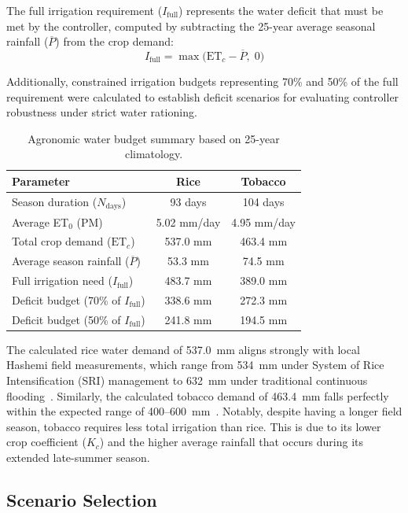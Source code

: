 The full irrigation requirement ($I_{\text{full}}$) represents the water deficit that must be met by the controller, computed by subtracting the 25-year average seasonal rainfall ($\overline{P}$) from the crop demand:
\begin{equation}
    I_{\text{full}} = \max\!\big(\text{ET}_c - \overline{P},\; 0\big)
\end{equation}

Additionally, constrained irrigation budgets representing 70\% and 50\% of the full requirement were calculated to establish deficit scenarios for evaluating controller robustness under strict water rationing.

\begin{table}[H]
\centering
\caption{Agronomic water budget summary based on 25-year climatology.}
\label{tab:budget}
\begin{tabular}{lcc}
\toprule
\textbf{Parameter} & \textbf{Rice} & \textbf{Tobacco} \\
\midrule
Season duration ($N_{\text{days}}$) & 93 days & 104 days \\
Average ET$_0$ (PM) & 5.02 mm/day & 4.95 mm/day \\
Total crop demand ($\text{ET}_c$) & 537.0 mm & 463.4 mm \\
Average season rainfall ($\overline{P}$) & 53.3 mm & 74.5 mm \\
Full irrigation need ($I_{\text{full}}$) & 483.7 mm & 389.0 mm \\
Deficit budget (70\% of $I_{\text{full}}$) & 338.6 mm & 272.3 mm \\
Deficit budget (50\% of $I_{\text{full}}$) & 241.8 mm & 194.5 mm \\
\bottomrule
\end{tabular}
\end{table}

The calculated rice water demand of 537.0~mm aligns strongly with local Hashemi field measurements, which range from 534~mm under System of Rice Intensification (SRI) management to 632~mm under traditional continuous flooding~\cite{jalali2021}. Similarly, the calculated tobacco demand of 463.4~mm falls perfectly within the expected range of 400--600~mm~\cite{fao_tobacco}. Notably, despite having a longer field season, tobacco requires less total irrigation than rice. This is due to its lower crop coefficient ($K_c$) and the higher average rainfall that occurs during its extended late-summer season.

\subsection{Scenario Selection}


